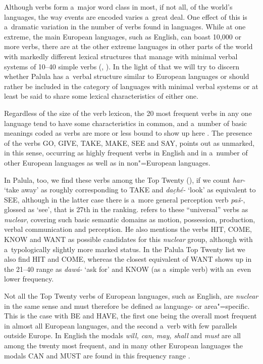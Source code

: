 Although verbs form a~major word class in most, if not all, of the world's languages, the way events are encoded varies a~great deal. One effect of this is a~dramatic variation in the number of verbs found in languages. While at one extreme, the main European languages, such as English, can boast 10,000 or more verbs, there are at the other extreme languages in other parts of the world with markedly different lexical structures that manage with minimal verbal systems of 10--40 simple verbs (\citealt[347--348]{viberg1993}, \citeyear[409]{viberg2006}). In the light of that we will try to discern whether Palula has a~verbal structure similar to European languages or should rather be included in the category of languages with minimal verbal systems or at least be said to share some lexical characteristics of either one.



Regardless of the size of the verb lexicon, the 20 most frequent verbs in any one language tend to have some characteristics in common, and a~number of basic meanings coded as verbs are more or less bound to show up here \citep[209]{viberg2006}. The presence of the verbs GO, GIVE, TAKE, MAKE, SEE and SAY, \citet[247]{viberg1993} points out as unmarked, in this sense, occurring as highly frequent verbs in English and in a~number of other European languages as well as in non"=European languages. 



In Palula, too, we find these verbs among the Top Twenty (), if we count \textit{har-} `take away' as roughly corresponding to TAKE and \textit{dac̣hé-} `look' as equivalent to SEE, although in the latter case there is a~more general perception verb \textit{paš-}, glossed as `see', that is 27th in the ranking. \citet[409]{viberg2006} refers to these ``universal'' verbs as \textit{nuclear}, covering such basic semantic domains as motion, possession, production, verbal communication and perception. He also mentions the verbs HIT, COME, KNOW and WANT as possible candidates for this \textit{nuclear} group, although with a~typologically slightly more marked status. In the Palula Top Twenty list we also find HIT and COME, whereas the closest equivalent of WANT shows up in the 21--40 range as \textit{dawá-} `ask for' and KNOW (as a~simple verb) with an~even lower frequency.



Not all the Top Twenty verbs of European languages, such as English, are \textit{nuclear} in the same sense and must therefore be defined as language- or area"=specific. This is the case with BE and HAVE, the first one being the overall most frequent in almost all European languages, and the second a~verb with few parallels outside Europe. In English the modals \textit{will, can, may, shall} and \textit{must} are all among the twenty most frequent, and in many other European languages the modals CAN and MUST are found in this frequency range \citep[346--349]{viberg1993}. 



